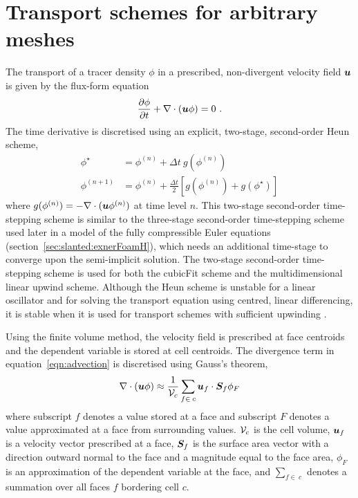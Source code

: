 \section{Transport schemes for arbitrary meshes}
\label{sec:cubicFit:transport}

The transport of a tracer density $\phi$ in a prescribed, non-divergent velocity field $\bm{u}$ is given by the flux-form equation \citep{nair-lauritzen2010}
\begin{align}		
	\frac{\partial \phi}{\partial t} + \nabla \cdot \left( \bm{u} \phi \right) = 0 \text{ .} \label{eqn:advection}		
\end{align}
The time derivative is discretised using an explicit, two-stage, second-order Heun scheme,
\begin{subequations}
\begin{align}
	\phi^\star &= \phi^{(n)} + \Delta t \: g(\phi^{(n)}) \\
	\phi^{(n+1)} &= \phi^{(n)} + \frac{\Delta t}{2} \left[ g(\phi^{(n)}) + g(\phi^{\star}) \right]
\end{align} \label{eqn:heun}%
\end{subequations}
\unskip where \(g(\phi^{(n)}) = - \nabla \cdot (\bm{u} \phi^{(n)})\) at time level \(n\).
This two-stage second-order time-stepping scheme is similar to the three-stage second-order time-stepping scheme used later in a model of the fully compressible Euler equations (section~\ref{sec:slanted:exnerFoamH}), which needs an additional time-stage to converge upon the semi-implicit solution.
The two-stage second-order time-stepping scheme is used for both the cubicFit scheme and the multidimensional linear upwind scheme.
Although the Heun scheme is unstable for a linear oscillator \citep{durran2013} and for solving the transport equation using centred, linear differencing, it is stable when it is used for transport schemes with sufficient upwinding \citep[p. 149]{hundsdorfer-verwer2013}.

Using the finite volume method, the velocity field is prescribed at face centroids and the dependent variable is stored at cell centroids.  The divergence term in equation~\eqref{eqn:advection} is discretised using Gauss's theorem,
\begin{align}
	\nabla \cdot \left( \bm{u} \phi \right) \approx \frac{1}{\mathcal{V}_c} \sum_{f \in\:c} \bm{u}_f \cdot \bm{S}_f \phi_F \label{eqn:gauss-div}
\end{align}
where subscript $f$ denotes a value stored at a face and subscript $F$ denotes a value approximated at a face from surrounding values.  $\mathcal{V}_c$ is the cell volume, $\bm{u}_f$ is a velocity vector prescribed at a face, $\bm{S}_f$ is the surface area vector with a direction outward normal to the face and a magnitude equal to the face area, $\phi_F$ is an approximation of the dependent variable at the face, and $\sum_{f \in\:c}$ denotes a summation over all faces $f$ bordering cell $c$.

